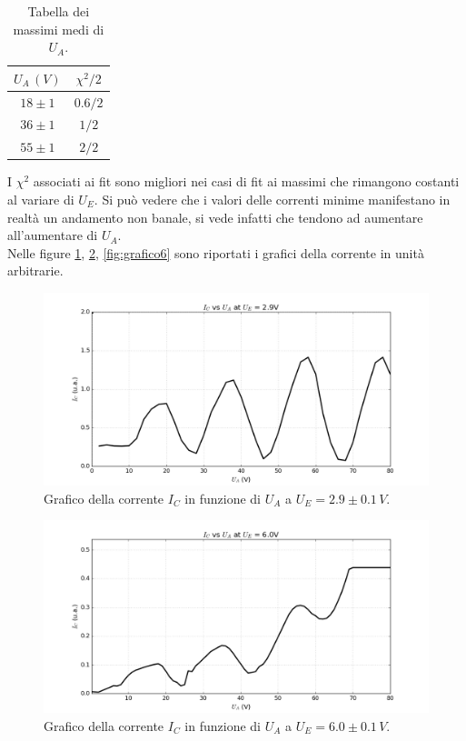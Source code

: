 \documentclass[10pt,a4paper]{article}
\begin{document}
\begin{table}[!htb]
\centering
\begin{tabular}{|c|c|}
\hline 
$U_A\,(V)$ & $\chi^2 /2$ \\ 
\hline 
$18\pm1$ & $0.6/2$ \\ 
\hline 
$36\pm1$ & $1/2$ \\ 
\hline 
$55\pm1$ & $2/2$ \\
\hline
\end{tabular}
\caption{Tabella dei massimi medi di $U_A$.\label{tab:tabellaMaxMed}}

\end{table}

I $\chi^2$ associati ai fit sono migliori nei casi di fit ai massimi che rimangono costanti al variare di $U_E$. Si può vedere che i valori delle correnti minime manifestano in realtà un andamento non banale, si vede infatti che tendono ad aumentare all'aumentare di $U_A$.\\
Nelle figure \ref{fig:grafico4}, \ref{fig:grafico5}, \ref{fig:grafico6} sono riportati i grafici della corrente in unità arbitrarie. 

\begin{figure}[!htb]
  \centering
  \includegraphics[scale=.5]{plot29.png}
\caption{Grafico della corrente $I_C$ in funzione di $U_A$ a $U_E = 2.9\pm0.1 \, V$.\label{fig:grafico4}}

\end{figure}

\begin{figure}[!htb]
  \centering
  \includegraphics[scale=.5]{plot60.png}
\caption{Grafico della corrente $I_C$ in funzione di $U_A$ a $U_E = 6.0 \pm 0.1\, V$.\label{fig:grafico5}}

\end{figure}
\end{document}
